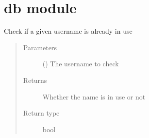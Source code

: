 \documentclass[letterpaper,10pt,english]{sphinxmanual}
\begin{document}
\section{db module}
\label{\detokenize{db:module-db}}\label{\detokenize{db:db-module}}\label{\detokenize{db::doc}}

\begin{fulllineitems}
\label{\detokenize{db:db.checkIfUsernameFree}}
Check if a given username is already in use
\begin{quote}\begin{description}
\item[{Parameters}] \leavevmode
{} () \textendash{} The username to check

\item[{Returns}] \leavevmode
Whether the name is in use or not

\item[{Return type}] \leavevmode
bool

\end{description}\end{quote}

\end{fulllineitems}

\end{document}
